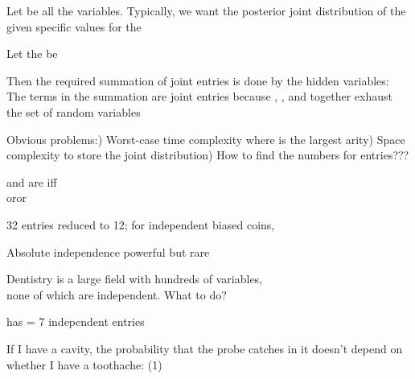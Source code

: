 \documentclass{article}
\begin{document}
\begin{huge}

Let  be all the variables. Typically, we want \al
  the posterior joint distribution of the  \al
  given specific values  for the  

Let the  be 

Then the required summation of joint entries is done by 
the hidden variables:
\mat{\[
\pv(\mbf{Y}|\mbf{E}\eq \mbf{e}) = \alpha \pv(\mbf{Y},\mbf{E}\eq \mbf{e})
= \alpha \mysum_{\smbf{h}} \pv(\mbf{Y},\mbf{E}\eq \mbf{e},\mbf{H}\eq \mbf{h})
\]}
The terms in the summation are joint entries because , , and  together exhaust the set of random variables

Obvious problems:) Worst-case time complexity  where  is the largest arity) Space complexity  to store the joint distribution) How to find the numbers for  entries???



 and  are  iff\\
\quad or\quad {}\quad or\quad {}

\textwidth
{}

\nl
{}

32 entries reduced to 12; for  independent biased coins, 

Absolute independence powerful but rare

Dentistry is a large field with hundreds of variables,\\
none of which are independent. What to do?


 has  = 7 independent entries

If I have a cavity, the probability that the probe catches in it
doesn't depend on whether I have a toothache:\al
  (1) 


\end{huge}
\end{document}
